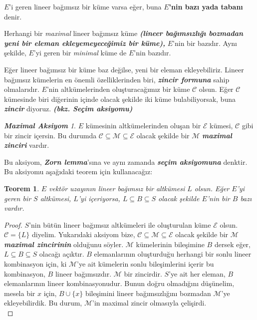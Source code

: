 \documentclass[11pt]{article}
\theoremstyle{plain}
\newtheorem{theorem}{Teorem}
\theoremstyle{definition}
\theoremstyle{remark}
\numberwithin{equation}{section}
\renewcommand{\%}{{\small \%}}
\begin{document}
$E$'i geren lineer bağımsız bir küme varsa eğer, buna \textbf{$E$'nin bazı yada tabanı} denir.\newpage

Herhangi bir \emph{maximal} lineer bağımsız küme \emph{\textbf{(lineer bağımsızlığı bozmadan yeni bir eleman ekleyemeyeceğimiz bir küme),}} $E$'nin bir bazıdır. Aynı şekilde, $E$'yi geren bir \emph{minimal} küme de $E$'nin bazıdır.

Eğer lineer bağımsız bir küme baz değilse, yeni bir eleman ekleyebiliriz. Lineer bağımsız kümelerin en önemli özelliklerinden biri, \emph{\textbf{zincir formuna}} sahip olmalarıdır. $E$'nin altkümelerinden oluşturacağımız bir küme $\mathscr{C}$ olsun. Eğer $\mathscr{C}$ kümesinde biri diğerinin içinde olacak şekilde  iki küme bulabiliyorsak, buna \emph{\textbf{zincir}} diyoruz. \emph{\textbf{(bkz. Seçim aksiyomu)}}
\newtheorem*{maxim}{\textbf{Maximal Aksiyom}}
\begin{maxim}
$E$ kümesinin altkümelerinden oluşan bir $\mathscr{E}$ kümesi, $\mathscr{C}$ gibi bir zincir içersin. Bu durumda $\mathscr{C}\subseteq\mathscr{M}\subseteq\mathscr{E}$ olacak şekilde bir $\mathscr{M}$ \emph{\textbf{maximal zinciri}} vardır.
\end{maxim}
Bu aksiyom, \emph{\textbf{Zorn lemma}}'sına ve aynı zamanda \emph{\textbf{seçim aksiyomuna}} denktir. Bu aksiyomu aşağıdaki teorem için kullanacağız:

\begin{theorem}
$E$ vektör uzayının lineer bağımsız bir altkümesi $L$ olsun. Eğer $E$'yi geren bir $S$ altkümesi, $L$'yi içeriyorsa, $L\subseteq B\subseteq S$ olacak şekilde $E$'nin bir $B$ bazı vardır.
\end{theorem}

\begin{proof}
$S$'nin bütün lineer bağımsız altkümeleri ile oluşturulan küme $\mathscr{E}$ olsun. $\mathscr{C}=\{L\}$ diyelim. Yukarıdaki aksiyom bize, $\mathscr{C}\subseteq\mathscr{M}\subseteq\mathscr{E}$ olacak şekilde bir $\mathscr{M}$ \emph{\textbf{maximal zincirinin}} olduğunu söyler. $\mathscr{M}$ kümelerinin bileşimine $B$ dersek eğer, $L\subseteq B\subseteq S$ olacağı açıktır. $B$ elemanlarının oluşturduğu herhangi bir sonlu lineer kombinasyon için, ki  $\mathscr{M}$'ye ait kümelerin sonlu bileşimlerini içerir bu kombinasyon, $B$ lineer bağımsızdır. $\mathscr{M}$ bir zincirdir. $S$'ye ait her eleman, $B$ elemanlarının lineer kombinasyonudur. Bunun doğru olmadığını düşünelim, mesela bir $x$ için, $B\cup \{x\}$ bileşimini lineer bağımsızlığını bozmadan $\mathscr{M}$'ye ekleyebilirdik. Bu durum, $\mathscr{M}$'in maximal zincir olmasıyla çelişirdi.\\[2pt]
\end{proof}
\end{document}
